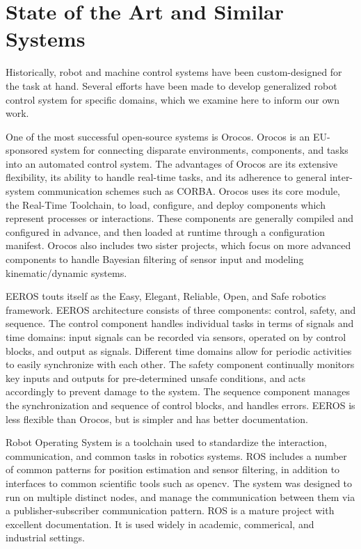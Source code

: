 \documentclass[10pt]{article}
\begin{document}
\section{State of the Art and Similar Systems}
Historically, robot and machine control systems have been custom-designed for the task at hand.  Several efforts have been made to develop generalized robot control system for specific domains, which we examine here to inform our own work.

One of the most successful open-source systems is Orocos.  Orocos is an EU-sponsored system for connecting disparate environments, components, and tasks into an automated control system.  The advantages of Orocos are its extensive flexibility, its ability to handle real-time tasks, and its adherence to general inter-system communication schemes such as CORBA.  Orocos uses its core module, the Real-Time Toolchain, to load, configure, and deploy components which represent processes or interactions.  These components are generally compiled and configured in advance, and then loaded at runtime through a configuration manifest.  Orocos also includes two sister projects, which focus on more advanced components to handle Bayesian filtering of sensor input and modeling kinematic/dynamic systems.

EEROS touts itself as the Easy, Elegant, Reliable, Open, and Safe robotics framework.  EEROS architecture consists of three components: control, safety, and sequence.  The control component handles individual tasks in terms of signals and time domains: input signals can be recorded via sensors, operated on by control blocks, and output as signals.  Different time domains allow for periodic activities to easily synchronize with each other.  The safety component continually monitors key inputs and outputs for pre-determined unsafe conditions, and acts accordingly to prevent damage to the system.  The sequence component manages the synchronization and sequence of control blocks, and handles errors.  EEROS is less flexible than Orocos, but is simpler and has better documentation.

Robot Operating System is a toolchain used to standardize the interaction, communication, and common tasks in robotics systems.  ROS includes a number of common patterns for position estimation and sensor filtering, in addition to interfaces to common scientific tools such as opencv.  The system was designed to run on multiple distinct nodes, and manage the communication between them via a publisher-subscriber communication pattern.  ROS is a mature project with excellent documentation.  It is used widely in academic, commerical, and industrial settings. 
\end{document}

